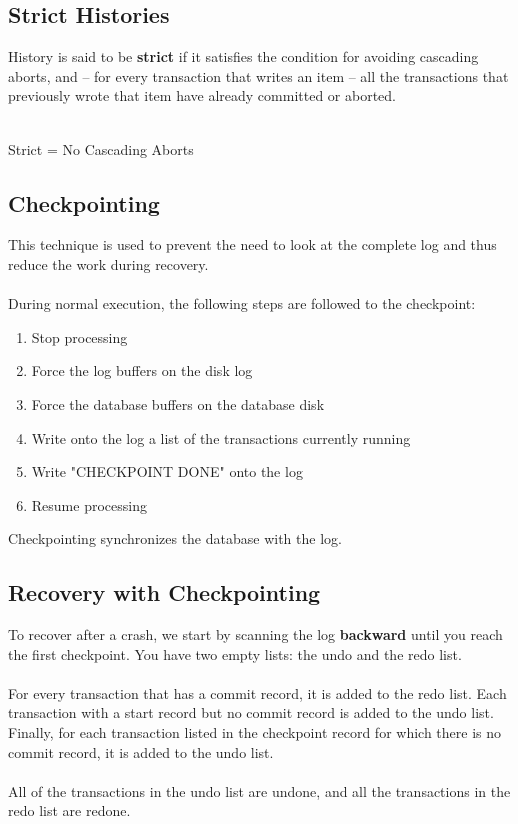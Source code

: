 \documentclass{article}
\begin{document}
\subsection{Strict Histories}
History is said to be \textbf{strict} if it satisfies the condition for avoiding cascading aborts, and -- for every transaction that writes an item -- all the transactions that previously wrote that item have already committed or aborted. \\ \\
\centerline{Strict = No Cascading Aborts}

\subsection{Checkpointing}
This technique is used to prevent the need to look at the complete log and thus reduce the work during recovery. \\ \\
During normal execution, the following steps are followed to the checkpoint:

\begin{enumerate}
	\item Stop processing
	\item Force the log buffers on the disk log
	\item Force the database buffers on the database disk
	\item Write onto the log a list of the transactions currently running
	\item Write "CHECKPOINT DONE" onto the log
	\item Resume processing
\end{enumerate}
Checkpointing synchronizes the database with the log.

\subsection{Recovery with Checkpointing}
To recover after a crash, we start by scanning the log \textbf{backward} until you reach the first checkpoint. You have two empty lists: the undo and the redo list. \\ \\
For every transaction that has a commit record, it is added to the redo list. Each transaction with a start record but no commit record is added to the undo list. Finally, for each transaction listed in the checkpoint record for which there is no commit record, it is added to the undo list. \\ \\
All of the transactions in the undo list are undone, and all the transactions in the redo list are redone.
\end{document}
